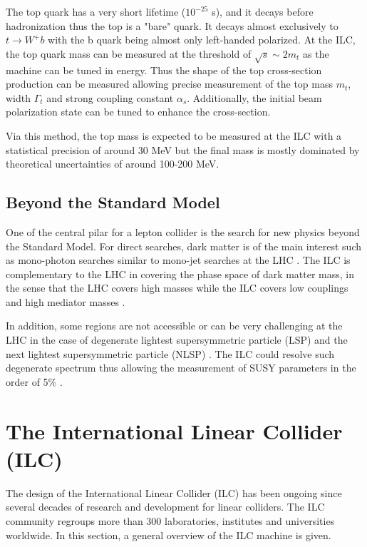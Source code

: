 The top quark has a very short lifetime ($10^{-25}$ s), and it decays before hadronization thus the top is a "bare" quark. It decays almost exclusively to $t \rightarrow W^+b$ with the b quark being almost only left-handed polarized. At the ILC, the top quark mass can be measured at the threshold of $\sqrt{s} \sim 2 m_t$ as the machine can be tuned in energy. Thus the shape of the top cross-section production can be measured allowing precise measurement of the top mass $m_t$, width $\Gamma_t$ and strong coupling constant $\alpha_s$. Additionally, the initial beam polarization state can be tuned to enhance the cross-section.

Via this method, the top mass is expected to be measured at the ILC with a statistical precision of around 30 MeV but the final mass is mostly dominated by theoretical uncertainties of around 100-200 MeV.

\subsection{Beyond the Standard Model}

One of the central pilar for a lepton collider is the search for new physics beyond the Standard Model. For direct searches, dark matter is of the main interest such as mono-photon searches similar to mono-jet searches at the LHC \cite{Gustavino:2017dub}. The ILC is complementary to the LHC in covering the phase space of dark matter mass, in the sense that the LHC covers high masses while the ILC covers low couplings and high mediator masses \cite{Habermehl:2017dxh}.

In addition, some regions are not accessible or can be very challenging at the LHC in the case of degenerate lightest supersymmetric particle (LSP) and the next lightest supersymmetric particle (NLSP) \cite{Baer:2011ec}. The ILC could resolve such degenerate spectrum thus allowing the measurement of SUSY parameters in the order of 5\% \cite{Reuter:2016olv}.

\section{The International Linear Collider (ILC)}
\label{sec:ILC}

The design of the International Linear Collider (ILC) has been ongoing since several decades of research and development for linear colliders. The ILC community regroups more than 300 laboratories, institutes and universities worldwide. In this section, a general overview of the ILC machine is given.


